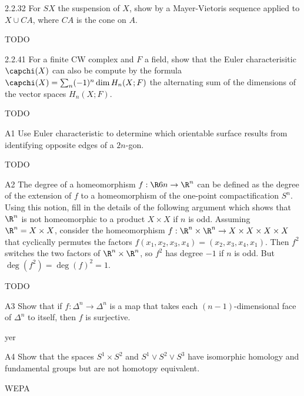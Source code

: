 \documentclass{article}
\begin{document}
\begin{exercise}{2.2.32}{\parindent}
  For $SX$ the suspension of $X$, show by a Mayer-Vietoris sequence
  applied to $X \cup CA$, where $CA$ is the cone on $A$.
\end{exercise}
\begin{solution}{\parindent}
  TODO
\end{solution}

\begin{exercise}{2.2.41}{\parindent}
  For a finite CW complex and $F$ a field, show that the Euler
  characterisitic $\capchi(X)$ can also be compute by the formula
  $\capchi(X) = \sum_n (-1)^n\dim H_n(X;F)$ the alternating sum of the
  dimensions of the vector spaces $H_n(X;F)$.
\end{exercise}
\begin{solution}{\parindent}
  TODO
\end{solution}

\begin{problem}{A1}{\parindent}
  Use Euler characteristic to determine which orientable surface
  results from identifying opposite edges of a $2n$-gon.
\end{problem}
\begin{solution}{\parindent}
  TODO
\end{solution}

\begin{problem}{A2}{\parindent}
  The degree of a homeomorphism $f: \R6n \to \R^n$ can be defined as
  the degree of the extension of $f$ to a homeomorphism of the
  one-point compactification $S^n$. Using this notion, fill in the
  details of the following argument which shows that $\R^n$ is not
  homeomorphic to a product $X \times X$ if $n$ is odd. Assuming $\R^n
  = X \times X$, consider the homeomorphism $f: \R^n \times \R^n \to X
  \times X \times X \times X$ that cyclically permutes the factors
  $f(x_1,x_2,x_3,x_4) = (x_2,x_3,x_4,x_1)$. Then $f^2$ switches the
  two factors of $\R^n \times \R^n$, so $f^2$ has degree $-1$ if $n$
  is odd. But $\deg(f^2) = \deg(f)^2 = 1$.
\end{problem}
\begin{solution}{\parindent}
  TODO
\end{solution}

\begin{problem}{A3}{\parindent}
  Show that if $f: \Delta^n \to \Delta^n$ is a map that takes each
  $(n-1)$-dimensional face of $\Delta^n$ to itself, then $f$ is
  surjective.
\end{problem}
\begin{solution}{\parindent}
  yer
\end{solution}

\begin{exercise}{A4}{\parindent}
  Show that the spaces $S^1 \times S^2$ and $S^1 \vee S^2 \vee S^3$
  have isomorphic homology and fundamental groups but are not homotopy
  equivalent.
\end{exercise}
\begin{solution}{\parindent}
  WEPA
\end{solution}
\end{document}
